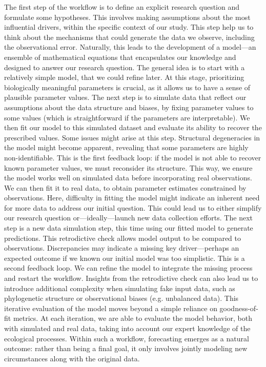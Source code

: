 \documentclass[11pt]{article}
\begin{document}
The first step of the workflow is to define an explicit research question and formulate some hypotheses. This involves making assumptions about the most influential drivers, within the specific context of our study. This step help us to think about the mechanisms that could generate the data we observe, including the observational error. Naturally, this leads to the development of a model---an ensemble of mathematical equations that encapsulates our knowledge and designed to answer our research question. The general idea is to start with a relatively simple model, that we could refine later. At this stage, prioritizing biologically meaningful parameters is crucial, as it allows us to have a sense of plausible parameter values. The next step is to simulate data that reflect our assumptions about the data structure and biases, by fixing parameter values to some values (which is straightforward if the parameters are interpretable). We then fit our model to this simulated dataset and evaluate its ability to recover the prescribed values. Some issues might arise at this step. Structural degeneracies in the model might become apparent, revealing that some parameters are highly non-identifiable. This is the first feedback loop: if the model is not able to recover known parameter values, we must reconsider its structure. This way, we ensure the model works well on simulated data before incorporating real observations. We can then fit it to real data, to obtain parameter estimates constrained by observations. Here, difficulty in fitting the model might indicate an inherent need for more data to address our initial question. This could lead us to either simplify our research question or---ideally---launch new data collection efforts. The next step is a new data simulation step, this time using our fitted model to generate predictions. This retrodictive check allows model output to be compared to observations. Discrepancies may indicate a missing key driver---perhaps an expected outcome if we known our initial model was too simplistic. This is a second feedback loop. We can refine the model to integrate the missing process and restart the workflow. Insights from the retrodictive check can also lead us to introduce additional complexity when simulating fake input data, such as phylogenetic structure or observational biases (e.g. unbalanced data). This iterative evaluation of the model moves beyond a simple reliance on goodness-of-fit metrics. At each iteration, we are able to evaluate the model behavior, both with simulated and real data, taking into account our expert knowledge of the ecological processes. Within such a workflow, forecasting emerges as a natural outcome: rather than being a final goal, it only involves jointly modeling new circumstances along with the original data.
\end{document}

